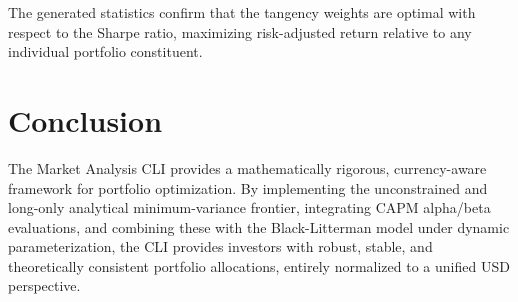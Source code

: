 \documentclass[11pt,a4paper]{article}
\begin{document}
The generated statistics confirm that the tangency weights are optimal with respect to the Sharpe ratio, maximizing risk-adjusted return relative to any individual portfolio constituent.

\section{Conclusion}

The Market Analysis CLI provides a mathematically rigorous, currency-aware framework for portfolio optimization. By implementing the unconstrained and long-only analytical minimum-variance frontier, integrating CAPM alpha/beta evaluations, and combining these with the Black-Litterman model under dynamic parameterization, the CLI provides investors with robust, stable, and theoretically consistent portfolio allocations, entirely normalized to a unified USD perspective.
\end{document}
